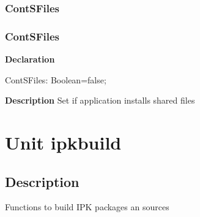 \documentclass{report}
\newif\ifpdf
\begin{document}
\subsection*{\large{\textbf{ContSFiles}}\normalsize\hspace{1ex}\hrulefill}
\else
\subsection*{ContSFiles}
\fi
\label{imainunit-ContSFiles}
\begin{list}{}{
\setlength{\itemindent}{0cm}
\setlength{\listparindent}{0cm}
\setlength{\leftmargin}{\evensidemargin}
\addtolength{\leftmargin}{\tmplength}
\settowidth{\labelsep}{X}
\addtolength{\leftmargin}{\labelsep}
\setlength{\labelwidth}{\tmplength}
}
\item[\textbf{Declaration}\hfill]
\ifpdf
\begin{flushleft}
\fi
\begin{ttfamily}
ContSFiles: Boolean=false;\end{ttfamily}

\ifpdf
\end{flushleft}
\fi

\par
\item[\textbf{Description}]
Set if application installs shared files

\end{list}
\chapter{Unit ipkbuild}
\label{ipkbuild}
\section{Description}
Functions to build IPK packages an sources
\end{document}
